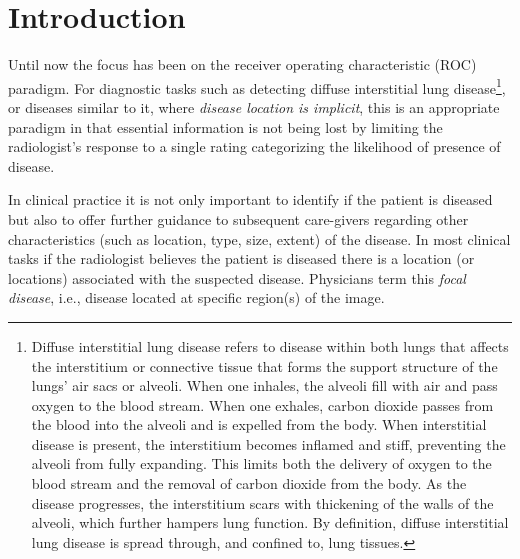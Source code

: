 \documentclass[
]{book}
\begin{document}
\hypertarget{froc-paradigm-intro}{%
\section{Introduction}\label{froc-paradigm-intro}}

Until now the focus has been on the receiver operating characteristic (ROC) paradigm. For diagnostic tasks such as detecting diffuse interstitial lung disease\footnote{Diffuse interstitial lung disease refers to disease within both lungs that affects the interstitium or connective tissue that forms the support structure of the lungs' air sacs or alveoli. When one inhales, the alveoli fill with air and pass oxygen to the blood stream. When one exhales, carbon dioxide passes from the blood into the alveoli and is expelled from the body. When interstitial disease is present, the interstitium becomes inflamed and stiff, preventing the alveoli from fully expanding. This limits both the delivery of oxygen to the blood stream and the removal of carbon dioxide from the body. As the disease progresses, the interstitium scars with thickening of the walls of the alveoli, which further hampers lung function. By definition, diffuse interstitial lung disease is spread through, and confined to, lung tissues.}, or diseases similar to it, where \emph{disease location is implicit}, this is an appropriate paradigm in that essential information is not being lost by limiting the radiologist's response to a single rating categorizing the likelihood of presence of disease.

In clinical practice it is not only important to identify if the patient is diseased but also to offer further guidance to subsequent care-givers regarding other characteristics (such as location, type, size, extent) of the disease. In most clinical tasks if the radiologist believes the patient is diseased there is a location (or locations) associated with the suspected disease. Physicians term this \emph{focal disease}, i.e., disease located at specific region(s) of the image.
\end{document}

